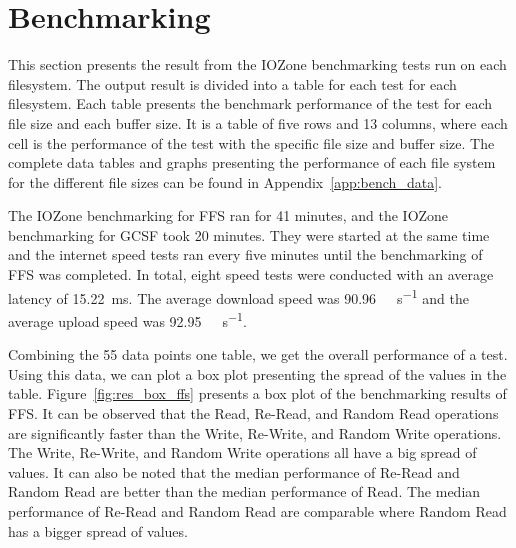 \section{Benchmarking}
\label{sec:res_bench}
This section presents the result from the IOZone benchmarking tests run on each filesystem. The output result is divided into a table for each test for each filesystem. Each table presents the benchmark performance of the test for each file size and each buffer size. It is a table of five rows and 13 columns, where each cell is the performance of the test with the specific file size and buffer size. The complete data tables and graphs presenting the performance of each file system for the different file sizes can be found in Appendix~\ref{app:bench_data}.

The IOZone benchmarking for FFS ran for 41 minutes, and the IOZone benchmarking for GCSF took 20 minutes. They were started at the same time and the internet speed tests ran every five minutes until the benchmarking of FFS was completed. In total, eight speed tests were conducted with an average latency of \SI{15.22}{\milli\second}. The average download speed was \SI[per-mode = symbol]{90.96}{\mega\bit\per\second} and the average upload speed was \SI[per-mode = symbol]{92.95}{\mega\bit\per\second}.

Combining the 55 data points one table, we get the overall performance of a test. Using this data, we can plot a box plot presenting the spread of the values in the table. Figure~\ref{fig:res_box_ffs} presents a box plot of the benchmarking results of FFS. It can be observed that the Read, Re-Read, and Random Read operations are significantly faster than the Write, Re-Write, and Random Write operations. The Write, Re-Write, and Random Write operations all have a big spread of values. It can also be noted that the median performance of Re-Read and Random Read are better than the median performance of Read. The median performance of Re-Read and Random Read are comparable where Random Read has a bigger spread of values.

